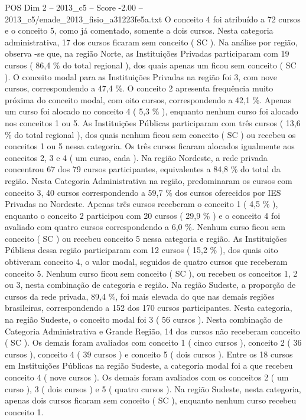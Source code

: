 \begin{textsample}{POS Dim 2 – 2013\_c5 – Score -2.00 – 2013\_c5/enade\_2013\_fisio\_a31223fe5a.txt}
O conceito 4 foi atribuído a 72 cursos e o conceito 5, como já comentado, somente a dois cursos.
Nesta categoria administrativa, 17 dos cursos ficaram sem conceito ( SC ).
Na análise por região, observa -se que, na região Norte, as Instituições Privadas participaram com 19 cursos ( 86,4 \% do total regional ), dos quais apenas um ficou sem conceito ( SC ).
O conceito modal para as Instituições Privadas na região foi 3, com nove cursos, correspondendo a 47,4 \%.
O conceito 2 apresenta frequência muito próxima do conceito modal, com oito cursos, correspondendo a 42,1 \%.
Apenas um curso foi alocado no conceito 4 ( 5,3 \% ), enquanto nenhum curso foi alocado nos conceitos 1 ou 5.
As Instituições Públicas participaram com três cursos ( 13,6 \% do total regional ), dos quais nenhum ficou sem conceito ( SC ) ou recebeu os conceitos 1 ou 5 nessa categoria.
Os três cursos ficaram alocados igualmente aos conceitos 2, 3 e 4 ( um curso, cada ).
Na região Nordeste, a rede privada concentrou 67 dos 79 cursos participantes, equivalentes a 84,8 \% do total da região.
Nesta Categoria Administrativa na região, predominaram os cursos com conceito 3, 40 cursos correspondendo a 59,7 \% dos cursos oferecidos por IES Privadas no Nordeste.
Apenas três cursos receberam o conceito 1 ( 4,5 \% ), enquanto o conceito 2 participou com 20 cursos ( 29,9 \% ) e o conceito 4 foi avaliado com quatro cursos correspondendo a 6,0 \%.
Nenhum curso ficou sem conceito ( SC ) ou recebeu conceito 5 nessa categoria e região.
As Instituições Públicas dessa região participaram com 12 cursos ( 15,2 \% ), dos quais oito obtiveram conceito 4, o valor modal, seguidos de quatro cursos que receberam conceito 5.
Nenhum curso ficou sem conceito ( SC ), ou recebeu os conceitos 1, 2 ou 3, nesta combinação de categoria e região.
Na região Sudeste, a proporção de cursos da rede privada, 89,4 \%, foi mais elevada do que nas demais regiões brasileiras, correspondendo a 152 dos 170 cursos participantes.
Nesta categoria, na região Sudeste, o conceito modal foi 3 ( 56 cursos ).
Nesta combinação de Categoria Administrativa e Grande Região, 14 dos cursos não receberam conceito ( SC ).
Os demais foram avaliados com conceito 1 ( cinco cursos ), conceito 2 ( 36 cursos ), conceito 4 ( 39 cursos ) e conceito 5 ( dois cursos ).
Entre os 18 cursos em Instituições Públicas na região Sudeste, a categoria modal foi a que recebeu conceito 4 ( nove cursos ).
Os demais foram avaliados com os conceitos 2 ( um curso ), 3 ( dois cursos ) e 5 ( quatro cursos ).
Na região Sudeste, nesta categoria, apenas dois cursos ficaram sem conceito ( SC ), enquanto nenhum curso recebeu conceito 1.

\end{textsample}
